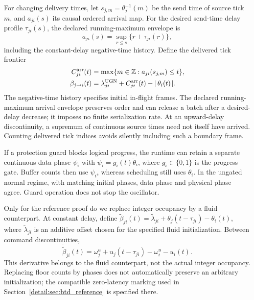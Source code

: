 For changing delivery times, let $s_{j,m}=\theta_j^{-1}(m)$ be the send
time of source tick $m$, and $a_{ji}(s)$ its causal ordered arrival map.
For the desired send-time delay profile $\tau_{ji}(s)$, the declared
running-maximum envelope is
\[
 a_{ji}(s)=\sup_{r\le s}\{r+\tau_{ji}(r)\},
\]
including the constant-delay negative-time history.
Define the delivered tick frontier
\begin{equation}
 \begin{aligned}
 C^{\rm arr}_{ji}(t)&=\max\{m\in\mathbb Z:a_{ji}(s_{j,m})\le t\},\\
 \beta_{j\to i}(t)&=\lambda^{\rm UGN}_{ji}
       +C^{\rm arr}_{ji}(t)-\lfloor\theta_i(t)\rfloor.
 \end{aligned}
 \label{detail:eq:fpd_ordered_arrivals}
\end{equation}
The negative-time history specifies initial in-flight frames. The declared
running-maximum arrival envelope preserves order and can release a batch
after a desired-delay decrease; it imposes no finite serialization rate.
At an upward-delay discontinuity, a supremum of continuous source times
need not itself have arrived. Counting delivered tick indices avoids
silently including such a boundary frame.

If a protection guard blocks logical progress, the runtime can retain a
separate continuous data phase $\psi_i$ with
$\dot\psi_i=g_i(t)\dot\theta_i$, where $g_i\in\{0,1\}$ is the progress
gate. Buffer counts then use $\psi_i$, whereas scheduling still uses
$\theta_i$. In the ungated normal regime, with matching initial phases, data phase and physical phase agree. Guard operation does not stop the oscillator.

Only for the reference proof do we replace integer occupancy by a
fluid counterpart. At constant delay, define
$\widetilde\beta_{ji}(t)=\widetilde\lambda_{ji}
+\theta_j(t-\tau_{ji})-\theta_i(t)$, where
$\widetilde\lambda_{ji}$ is an additive offset chosen for the specified
fluid initialization. Between command discontinuities,
\begin{equation}
 \dot{\widetilde\beta}_{ji}(t)
 =\omega_j^u+u_j(t-\tau_{ji})-\omega_i^u-u_i(t).
 \label{detail:eq:fpi_fluid_counterpart}
\end{equation}
This derivative belongs to the fluid counterpart, not the actual integer
occupancy. Replacing floor counts by phases does not automatically preserve
an arbitrary initialization; the compatible zero-latency marking used in
Section~\ref{detail:sec:btd_reference} is specified there.

